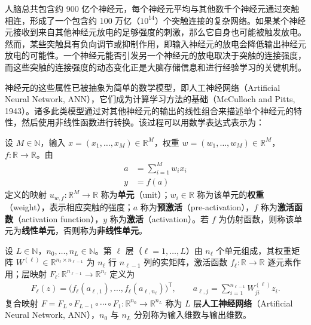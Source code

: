 \documentclass[../../main.tex]{subfiles}
\begin{document}
人脑总共包含约 900 亿个神经元，每个神经元平均与其他数千个神经元通过突触相连，形成了一个包含约 100 万亿（$10^{14}$）个突触连接的复杂网络。如果某个神经元接收到来自其他神经元放电的足够强度的刺激，那么它自身也可能被触发放电。然而，某些突触具有负向调节或抑制作用，即输入神经元的放电会降低输出神经元放电的可能性。一个神经元能否引发另一个神经元的放电取决于突触的连接强度，而这些突触的连接强度的动态变化正是大脑存储信息和进行经验学习的关键机制。

神经元的这些属性已被抽象为简单的数学模型，即人工神经网络（Artificial Neural Network, ANN），它们成为计算学习方法的基础（McCulloch and Pitts, 1943）。诸多此类模型通过对其他神经元的输出的线性组合来描述单个神经元的特性，然后使用非线性函数进行转换。该过程可以用数学表达式表示为：

\begin{definition}[人工神经网络]\label{definition:ch01-人工神经网络}
设 $M\in\mathbb{N}$，输入 $x=(x_1,\dots,x_M)\in\mathbb{R}^{M}$，权重 $w=(w_1,\dots,w_M)\in\mathbb{R}^{M}$，$f:\mathbb{R}\to\mathbb{R}$。由
\begin{align}
  a &= \sum_{i=1}^{M} w_i x_i \label{align:ch01-神经元预激活}\\
  y &= f(a) \label{align:ch01-神经元激活}
\end{align}
定义的映射 $u_{w,f}:\mathbb{R}^{M}\to\mathbb{R}$ 称为\textbf{单元}（unit）；$w_i\in\mathbb{R}$ 称为该单元的\textbf{权重}（weight），表示相应突触的强度；$a$ 称为\textbf{预激活}（pre-activation），$f$ 称为\textbf{激活函数}（activation function），$y$ 称为\textbf{激活}（activation）。若 $f$ 为仿射函数，则称该单元为\textbf{线性单元}，否则称为\textbf{非线性单元}。

设 $L\in\mathbb{N}$，$n_{0},\dots,n_{L}\in\mathbb{N}$。第 $\ell$ 层（$\ell=1,\dots,L$）由 $n_{\ell}$ 个单元组成，其权重矩阵 $W^{(\ell)}\in\mathbb{R}^{n_{\ell}\times n_{\ell-1}}$ 为 $n_{\ell}$ 行 $n_{\ell-1}$ 列的实矩阵，激活函数 $f_{\ell}:\mathbb{R}\to\mathbb{R}$ 逐元素作用；层映射 $F_{\ell}:\mathbb{R}^{n_{\ell-1}}\to\mathbb{R}^{n_{\ell}}$ 定义为
\begin{align*}
  F_{\ell}(z)=\bigl(f_{\ell}(a_{\ell,1}),\dots,f_{\ell}(a_{\ell,n_{\ell}})\bigr)^{\mathsf{T}},
  \qquad
  a_{\ell,j}=\sum_{i=1}^{n_{\ell-1}}W^{(\ell)}_{ji}z_i .
\end{align*}
复合映射 $F=F_{L}\circ F_{L-1}\circ\cdots\circ F_{1}:\mathbb{R}^{n_{0}}\to\mathbb{R}^{n_{L}}$ 称为 $L$ 层\textbf{人工神经网络}（Artificial Neural Network, ANN），$n_{0}$ 与 $n_{L}$ 分别称为输入维数与输出维数。
\end{definition}
\end{document}
